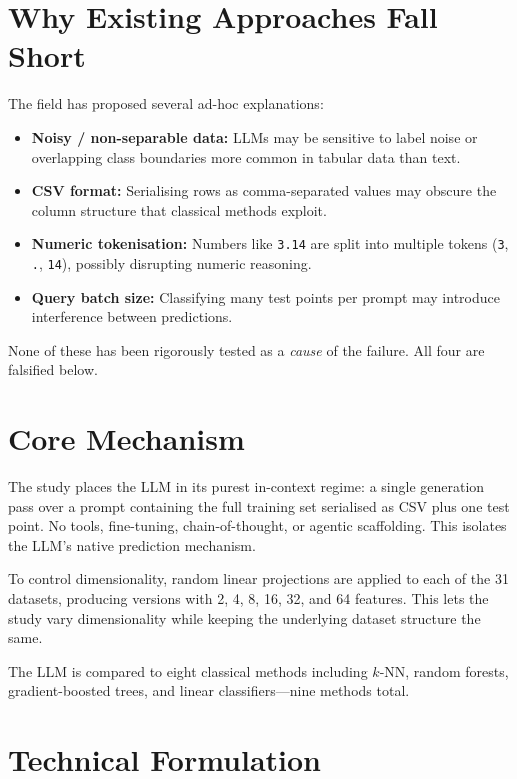 \documentclass[10pt,twocolumn]{article}
\begin{document}
\section{Why Existing Approaches Fall Short}

The field has proposed several ad-hoc explanations:
\begin{itemize}[itemsep=1pt,parsep=0pt]
  \item \textbf{Noisy / non-separable data:} LLMs may be sensitive to label noise
    or overlapping class boundaries more common in tabular data than text.
  \item \textbf{CSV format:} Serialising rows as comma-separated values may obscure
    the column structure that classical methods exploit.
  \item \textbf{Numeric tokenisation:} Numbers like \texttt{3.14} are split into
    multiple tokens (\texttt{3}, \texttt{.}, \texttt{14}), possibly disrupting
    numeric reasoning.
  \item \textbf{Query batch size:} Classifying many test points per prompt may
    introduce interference between predictions.
\end{itemize}

None of these has been rigorously tested as a \emph{cause} of the failure.
All four are falsified below.

\section{Core Mechanism}

The study places the LLM in its purest in-context regime: a single generation
pass over a prompt containing the full training set serialised as CSV plus one
test point. No tools, fine-tuning, chain-of-thought, or agentic scaffolding.
This isolates the LLM's native prediction mechanism.

To control dimensionality, random linear projections are applied to each of
the 31 datasets, producing versions with 2, 4, 8, 16, 32, and 64 features.
This lets the study vary dimensionality while keeping the underlying dataset
structure the same.

The LLM is compared to eight classical methods including $k$-NN, random forests,
gradient-boosted trees, and linear classifiers---nine methods total.

\section{Technical Formulation}
\end{document}
